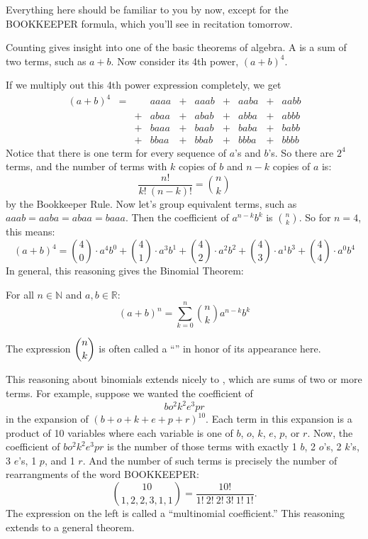 Everything here should be familiar to you by now, except for the
BOOKKEEPER formula, which you'll see in recitation tomorrow.
\fi

\label{binomial_theorem_sec}

Counting gives insight into one of the basic theorems of algebra.  A
 is a sum of two terms, such as $a + b$.  Now consider its
4th power, $(a + b)^4$.

If we multiply out this 4th power expression completely, we get
\[\begin{array}{rccccccccc}
(a + b)^4
   & = &    & aaaa & + & aaab & + & aaba & + & aabb \\
   &   &  + & abaa & + & abab & + & abba & + & abbb \\
   &   &  + & baaa & + & baab & + & baba & + & babb \\
   &   &  + & bbaa & + & bbab & + & bbba & + & bbbb
\end{array}\]
Notice that there is one term for every sequence of $a$'s and $b$'s.  So
there are $2^4$ terms, and the number of terms with $k$ copies of $b$ and
$n - k$ copies of $a$ is:
\[
\frac{n!}{k!\ (n-k)!} = \binom{n}{k}
\]
by the Bookkeeper Rule.  Now let's group equivalent terms, such as
$aaab = aaba = abaa = baaa$.  Then the coefficient of $a^{n-k} b^k$ is
$\binom{n}{k}$.  So for $n = 4$, this means:
\[
(a + b)^4 =
    \binom{4}{0} \cdot a^4 b^0 + 
    \binom{4}{1} \cdot a^3 b^1 + 
    \binom{4}{2} \cdot a^2 b^2 + 
    \binom{4}{3} \cdot a^1 b^3 + 
    \binom{4}{4} \cdot a^0 b^4
\]
In general, this reasoning gives the Binomial Theorem:

\begin{theorem}
For all $n \in \mathbb{N}$ and $a, b \in \mathbb{R}$:
%
\[
(a + b)^n = \sum_{k=0}^n \binom{n}{k} a^{n-k} b^k
\]
\end{theorem}

The expression $\dbinom{n}{k}$ is often called a ``'' in honor of its appearance here.

This reasoning about binomials extends nicely to ,
which are sums of two or more terms.  For example, suppose we wanted
the coefficient of
%
\[
b o^2 k^2 e^3 p r
\]
%
in the expansion of $(b + o + k + e + p + r)^{10}$.  Each term in this
expansion is a product of 10 variables where each variable is one of
$b$, $o$, $k$, $e$, $p$, or $r$.  Now, the coefficient of $b o^2 k^2
e^3 p r$ is the number of those terms with exactly 1 $b$, 2 $o$'s, 2
$k$'s, 3 $e$'s, 1 $p$, and 1 $r$.  And the number of such terms is
precisely the number of rearrangments of the word BOOKKEEPER:
\[
\binom{10}{1,2,2,3,1,1} = \frac{10!}{1!\ 2!\ 2!\ 3!\ 1!\ 1!}.
\]
The expression on the left is called a ``multinomial coefficient.''  This
reasoning extends to a general theorem.

